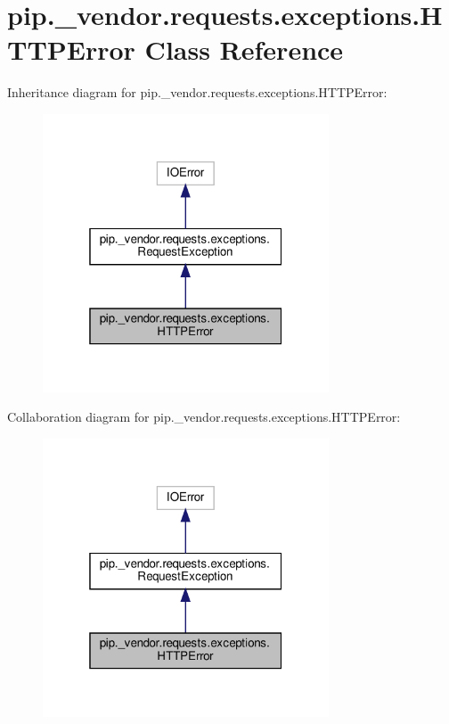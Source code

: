 \hypertarget{classpip_1_1__vendor_1_1requests_1_1exceptions_1_1HTTPError}{}\section{pip.\+\_\+vendor.\+requests.\+exceptions.\+H\+T\+T\+P\+Error Class Reference}
\label{classpip_1_1__vendor_1_1requests_1_1exceptions_1_1HTTPError}


Inheritance diagram for pip.\+\_\+vendor.\+requests.\+exceptions.\+H\+T\+T\+P\+Error\+:
\nopagebreak
\begin{figure}[H]
\begin{center}
\leavevmode
\includegraphics[width=241pt]{classpip_1_1__vendor_1_1requests_1_1exceptions_1_1HTTPError__inherit__graph}
\end{center}
\end{figure}


Collaboration diagram for pip.\+\_\+vendor.\+requests.\+exceptions.\+H\+T\+T\+P\+Error\+:
\nopagebreak
\begin{figure}[H]
\begin{center}
\leavevmode
\includegraphics[width=241pt]{classpip_1_1__vendor_1_1requests_1_1exceptions_1_1HTTPError__coll__graph}
\end{center}
\end{figure}
